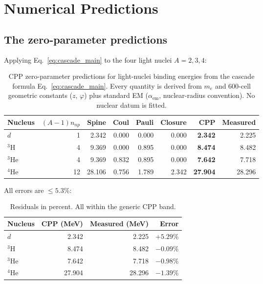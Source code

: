 \documentclass[11pt,letterpaper]{article}
\newcommand{\phig}{\varphi}
\newcommand{\npnp}{n_{np}}
\begin{document}
\section{Numerical Predictions}
\label{sec:numerical}

\subsection{The zero-parameter predictions}

Applying Eq.~\eqref{eq:cascade_main} to the four light nuclei $A = 2, 3, 4$:

\begin{table}[H]
\centering
\caption{CPP zero-parameter predictions for light-nuclei binding energies from the cascade formula Eq.~\eqref{eq:cascade_main}. Every quantity is derived from $m_e$ and 600-cell geometric constants ($z$, $\phig$) plus standard EM ($\alpha_{\mathrm{em}}$, nuclear-radius convention). No nuclear datum is fitted.}
\label{tab:predictions}
\begin{tabular}{@{}lrrrrrrr@{}}
\toprule
Nucleus & $(A{-}1)\npnp$ & Spine & Coul & Pauli & Closure & CPP & Measured \\
\midrule
$d$          & 1  & 2.342  & 0.000 & 0.000  & 0.000 & \textbf{2.342} & 2.225 \\
${}^{3}\mathrm{H}$   & 4  & 9.369  & 0.000 & 0.895  & 0.000 & \textbf{8.474} & 8.482 \\
${}^{3}\mathrm{He}$  & 4  & 9.369  & 0.832 & 0.895  & 0.000 & \textbf{7.642} & 7.718 \\
${}^{4}\mathrm{He}$  & 12 & 28.106 & 0.756 & 1.789  & 2.342 & \textbf{27.904} & 28.296 \\
\bottomrule
\end{tabular}
\end{table}

All errors are $\leq 5.3\%$:

\begin{table}[H]
\centering
\caption{Residuals in percent. All within the generic CPP band.}
\label{tab:residuals}
\begin{tabular}{@{}lrrr@{}}
\toprule
Nucleus & CPP (MeV) & Measured (MeV) & Error \\
\midrule
$d$          & 2.342  & 2.225  & $+5.29\%$ \\
${}^{3}\mathrm{H}$   & 8.474  & 8.482  & $-0.09\%$ \\
${}^{3}\mathrm{He}$  & 7.642  & 7.718  & $-0.98\%$ \\
${}^{4}\mathrm{He}$  & 27.904 & 28.296 & $-1.39\%$ \\
\bottomrule
\end{tabular}
\end{table}
\end{document}
